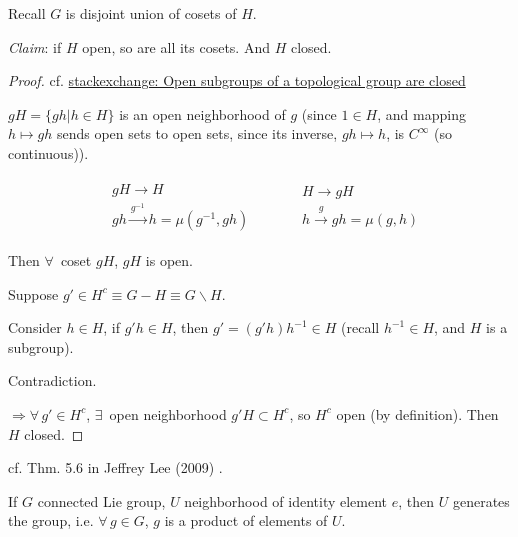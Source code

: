 Recall $G$ is disjoint union of cosets of $H$.

\emph{Claim}: if $H$ open, so are all its cosets. And $H$ closed.

\begin{proof}
	cf. \href{https://math.stackexchange.com/questions/226847/open-subgroups-of-a-topological-group-are-closed}{stackexchange: Open subgroups of a topological group are closed}
	
	$gH = \lbrace gh | h \in H \rbrace$ is an open neighborhood of $g$ (since $1 \in H$, and mapping $h \mapsto gh$ sends open sets to open sets, since its inverse, $gh \mapsto h$, is $C^{\infty}$ (so continuous)).
	
	\[
	\begin{gathered}
	\begin{aligned}
	& gH \to H \\
	& gh \xrightarrow{g^{-1}} h = \mu(g^{-1}, gh)
	\end{aligned} \qquad \, 
	\begin{aligned}
	& H \to gH \\
	& h \xrightarrow{g} gh = \mu(g, h) 
	\end{aligned}
	\end{gathered}
	\]
	
	Then $\forall \, $ coset $gH$, $gH$ is open.
	
	Suppose $g' \in H^c \equiv G-H \equiv G\backslash H$.
	
	Consider $h\in H$, if $g'h \in H$, then $g' = (g'h)h^{-1} \in H$ (recall $h^{-1} \in H$, and $H$ is a subgroup).
	
	Contradiction.
	
	$\Longrightarrow \forall \, g' \in H^c$, $\exists \, $ open neighborhood $g'H \subset H^c$, so $H^c$ open (by definition). Then $H$ closed.
	
	\end{proof}

cf. Thm. 5.6 in Jeffrey Lee (2009) \cite{dgdt:JLee2009}.
\begin{theorem}
	If $G$ connected Lie group, $U$ neighborhood of identity element $e$, then $U$ generates the group, i.e. $\forall \, g \in G$, $g$ is a product of elements of $U$.
\end{theorem}

